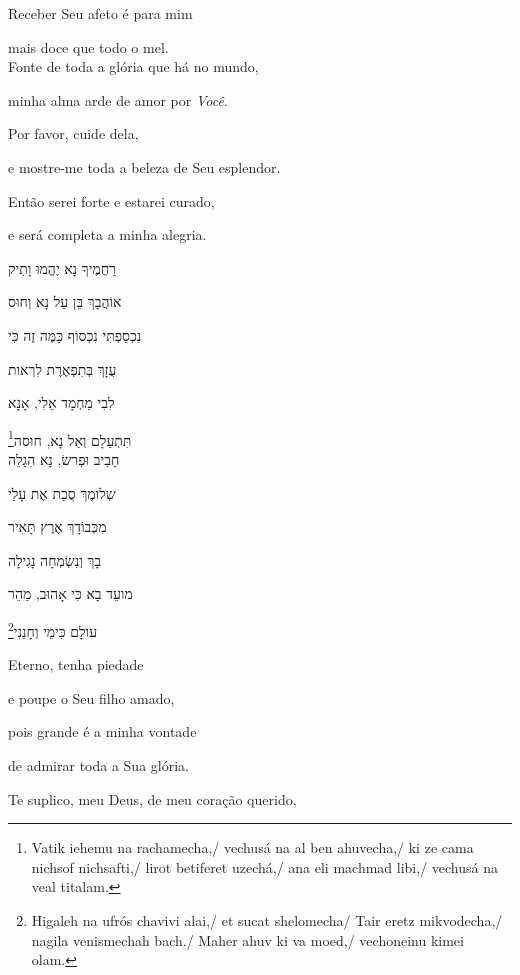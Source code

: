 Receber Seu afeto é para mim

mais doce que todo o mel.\\[10pt]

{Fonte de toda a glória que há no mundo},

minha alma arde de amor por \emph{Você}.

Por favor, cuide dela,

e mostre-me toda a beleza de Seu esplendor.

Então serei forte e estarei curado,

e será completa a minha alegria.\\[10pt]

\movetoevenpage
\raggedleft

\vspace*{1cm}

רַחֲמֶיךָ נָא יֶהֱמוּ וָתִיק \label{ref02}

אוֹהֲבָךְ בֵּן עַל נָא וְחוּס 

נִכְסַפְתִּי נִכְסוֹף כַּמֶּה זֶה כִּי 

עֻזָךְ בְּתִפְאֶרֶת לִרְאות 

לִבִי מַחְמָד אֵלִי, אָנָא 

\footnote{Vatik iehemu na rachamecha,/
vechusá na al ben ahuvecha,/ ki ze cama nichsof nichsafti,/ lirot betiferet uzechá,/
ana eli machmad libi,/ vechusá na veal titalam.}תִּתְעַלָם וְאַל נָא, חוּסה\\[10pt]

חָבִיב וּפְרשׂ, נָא הִגָלֵה

שְלומֶךְ סֻכַת אֶת עָלַי 

מִכְּבוֹדָךְ אֶרֶץ תָּאִיר 

בָךְ וְנִשְׂמְחָה נָגִילָה 

מועֵד בָא כִּי אָהוּב, מַהֵר

\footnote{
Higaleh na ufrós chavivi alai,/
et sucat shelomecha/ Tair eretz mikvodecha,/ nagila venismechah bach./ Maher ahuv ki va moed,/
vechoneinu kimei olam.}עולָם כִּימֵי וְחָנֵנִי

\movetooddpage
\raggedright

\vspace*{1cm}

Eterno, tenha piedade

e poupe o Seu filho amado,

pois grande é a minha vontade

de admirar toda a Sua glória.

Te suplico, meu Deus, de meu coração querido,

